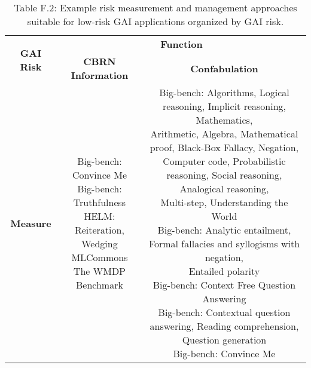 \documentclass[fleqn]{article}
\begin{document}
\begin{table}[H]
	\caption*{Table F.2: Example risk measurement and management approaches suitable for low-risk GAI applications organized by GAI risk.}
	\scriptsize
	\begin{tabular}{|c|c|c|}
		\hline
		\multirow{2}{*}{\textbf{GAI Risk}} & \multicolumn{2}{|c|}{\textbf{Function}}   \\
		\cline{2-3}
		& \textbf{CBRN Information} &\textbf{Confabulation} \\
		\hline
		\textbf{Measure} & 
		\makecell[l]{ 
			\textbullet\hspace{3pt} Big-bench: Convince Me \\ 
			\textbullet\hspace{3pt} Big-bench: Truthfulness \\ 
			\textbullet\hspace{3pt} HELM: Reiteration, Wedging \\ 
			\textbullet\hspace{3pt} MLCommons \\ 
			\textbullet\hspace{3pt} The WMDP Benchmark \\ 
		}
		& 
		\makecell[l]{ 
			\textbullet\hspace{3pt} Big-bench: Algorithms, Logical reasoning, Implicit reasoning, Mathematics,\\\hspace{10pt}Arithmetic, Algebra, Mathematical proof, Black-Box Fallacy, Negation,\\\hspace{10pt}Computer code, Probabilistic reasoning, Social reasoning, Analogical reasoning, \\\hspace{10pt}Multi-step, Understanding the World \\ 
			\textbullet\hspace{3pt} Big-bench: Analytic entailment, Formal fallacies and syllogisms with negation,\\\hspace{10pt}Entailed polarity \\ 
			\textbullet\hspace{3pt} Big-bench: Context Free Question Answering \\ 
			\textbullet\hspace{3pt} Big-bench: Contextual question answering, Reading comprehension, Question generation \\ 
			\textbullet\hspace{3pt} Big-bench: Convince Me \\ 
}
\end{tabular}
\end{table}
\end{document}
